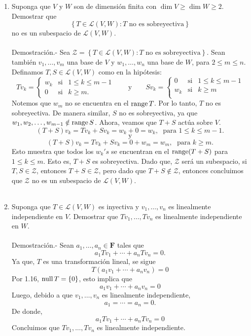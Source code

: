 \begin{enumerate}[\bfseries 1.]
    \item Suponga que $V$ y $W$ son de dimensión finita con $\dim V \geq \dim W\geq 2$. Demostrar que 
	$$\left\{T\in \mathcal{L}(V,W):T\mbox{ no es sobreyectiva}\right\}$$ 
	no es un subespacio de $\mathcal{L}(V,W)$.\\\\
	Demostración.-\; Sea $\mathcal{Z}= \left\{T\in \mathcal{L}(V,W):T\mbox{ no es sobreyectiva}\right\}$. Sean también $v_1,\ldots,v_m$ una base de $V$ y $w_1,\ldots,w_n$ una base de $W$, para $2\leq m \leq n$. Definamos $T,S\in \mathcal{L}(V,W)$ como en la hipótesis:
	$$
	Tv_k = 
	    \left\{
		\begin{array}{rcl}
		    w_k &\mbox{si}& 1\leq k \leq m-1\\
		    0 &\mbox{si}& k\geq m.
		\end{array}
	    \right.
	\qquad \mbox{y} \qquad
	Sv_k = 
	    \left\{
		\begin{array}{lcl}
		    0 &\mbox{si}& 1\leq k \leq m-1\\
		    w_k &\mbox{si}& k\geq m\\
		\end{array}
	    \right.
	$$
	Notemos que $w_m$ no se encuentra en el $\operatorname{range} T$. Por lo tanto, $T$ no es sobreyectiva. De manera similar, $S$ no es sobreyectiva, ya que $w_1,w_2,\ldots,w_{m-1}\notin \operatorname{range} S$. Ahora, veamos que $T+S$ actúa sobre $V$.
	$$(T+S)v_k=Tv_k+Sv_k=w_k+0=w_k,\; \mbox{ para }1\leq k \leq m-1.$$
	$$\mbox{y}$$
	$$(T+S)v_k = Tv_k+Sv_k=0+w_m=w_m,\; \mbox{ para }k\geq m.$$
	Esto muestra que todos los $w_k's$ se encuentran en el $\operatorname{range} (T+S)$ para $1\leq k \leq m$. Esto es, $T+S$ es sobreyectiva. Dado que, $\mathcal{Z}$ será un subespacio, si $T,S\in \mathcal{Z}$, entonces $T+S\in \mathcal{Z}$, pero dado que $T+S\notin \mathcal{Z}$, entonces concluimos que $\mathcal{Z}$ no es un subespacio de $\mathcal{L}(V,W)$.\\\\

    \item Suponga que $T\in \mathcal{L}(V,W)$ es inyectiva y $v_1,\ldots,v_n$ es linealmente independiente en $V$. Demostrar que $Tv_1,\ldots,Tv_n$ es linealmente independiente en $W$.\\\\
	Demostración.-\; Sean $a_1,\ldots, a_n\in \textbf{F}$ tales que
	$$a_1Tv_1+\cdots+a_nTv_n=0.$$
	Ya que, $T$ es una transformación lineal, se sigue
	$$T(a_1v_1+\cdots+a_nv_n)=0$$
	Por 1.16, $\operatorname{null} T=\left\{0\right\}$, esto implica que 
	$$a_1v_1+\cdots+a_nv_n=0$$
	Luego, debido a que $v_1,\ldots,v_n$ es linealmente independiente, 
	$$a_1=\cdots = a_n=0.$$
	De donde,
	$$a_1Tv_1+\cdots+a_nTv_n=0$$
	Concluimos que $Tv_1,\ldots,Tv_n$ es linealmente independiente.\\\\


\end{enumerate}
